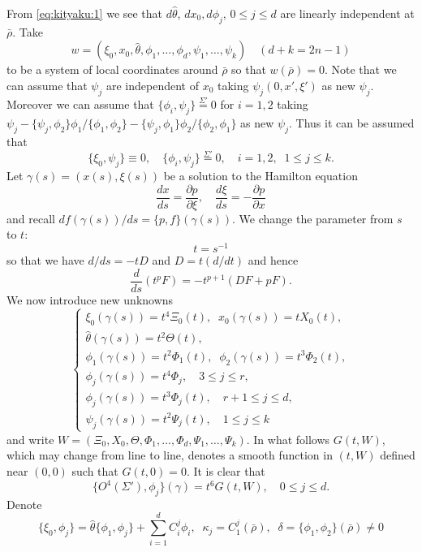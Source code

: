 \documentclass[12pt,leqno]{article} %
\def\dif{\partial}
\def\ga{\gamma}
\def\sieq{\overset{\Sigma'}{=}}
\def\bro{\bar\rho}
\def\bro{\bar\rho}
\numberwithin{equation}{section}
\begin{document}
%
%
From \eqref{eq:kityaku:1} we see that $d\hat\theta$, $dx_0, d\phi_j$, $0\leq j\leq d$ are linearly independent at $\bro$. Take 
%
\[
w=(\xi_0,x_0,\hat\theta, \phi_1,\ldots,\phi_d,\psi_1,\ldots,\psi_k)\quad (d+k=2n-1)
\]
%
to be a system of local coordinates around ${\bar\rho}$ so that $w(\bro)=0$. Note that we can assume that $\psi_j$ are independent of $x_0$ taking $\psi_j(0,x',\xi')$ as new $\psi_j$. 
Moreover we can assume that $\{\phi_i,\psi_j\}\sieq 0$ for $i=1,2$ taking $
\psi_j-\{\psi_j,\phi_2\}\phi_1/\{\phi_1,\phi_2\}-\{\psi_j,\phi_1\}\phi_2/\{\phi_2,\phi_1\}$ 
as new $\psi_j$. Thus it can be assumed that
%
\begin{equation}
\label{eq:psi:to:phi}
\{\xi_0,\psi_j\}\equiv 0,\quad \{\phi_i,\psi_j\}\sieq 0,\quad i=1,2,\;\;1\leq j\leq k.
\end{equation}
%
%
Let $\gamma(s)=(x(s),\xi(s))$ be a solution to the Hamilton equation 
%
\begin{equation}
\label{eq:Hamilton}
\frac{dx}{ds}=\frac{\dif p}{\dif \xi},\quad \frac{d\xi}{ds}=-\frac{\dif p}{\dif x}
\end{equation}
%
and recall $
df(\gamma(s))/ds=\{p,f\}(\gamma(s))$. 
We change the parameter from $s$ to $t$:
%
\[
t=s^{-1}
\]
%
so that we have $d/ds=-tD$ and $D=t(d/dt)$ and hence 
%
\[
\frac{d}{ds}(t^p F)=-t^{p+1}(DF+pF).
\]
%
 We now introduce new unknowns
%
\begin{equation}
\label{eq:okikae}
\begin{cases}
\xi_0(\gamma(s))=t^4\Xi_0(t),\;\;x_0(\gamma(s))=tX_0(t),\\
\hat\theta(\gamma(s))=t^2\Theta(t),\\
\phi_1(\gamma(s))=t^2\Phi_1(t),\;\;\phi_2(\gamma(s))=t^3\Phi_2(t),\\
\phi_j(\gamma(s))=t^4\Phi_j,\quad 3\leq j\leq r,\\
\phi_j(\gamma(s))=t^3\Phi_j(t),\quad r+1\leq j\leq d,\\
\psi_j(\gamma(s))=t^2\Psi_j(t),\quad 1\leq j\leq k
\end{cases}
\end{equation}
%
and write $
W=(\Xi_0,X_0, \Theta, \Phi_1,\ldots,\Phi_d,\Psi_1,\ldots,\Psi_k)$. 
In what follows $G(t, W)$, which may change from line to line,  denotes a smooth function in $(t, W)$ defined near $(0,0)$ such that $G(t,0)=0$. It is clear that 
%
\[
\{O^4(\Sigma'), \phi_j\}(\ga)=t^6G(t, W),\quad 0\leq j\leq d.
\]
%
Denote 
%
\begin{equation}
\label{eq:0toj}
 \{\xi_0, \phi_j\}=\hat\theta\{\phi_1,\phi_j\}+\sum_{i=1}^dC_i^j\phi_i, \;\;\kappa_j=C_1^j({\bar\rho}), \;\;\delta=\{\phi_1,\phi_2\}({\bar\rho})\neq 0
 \end{equation}
\end{document}
